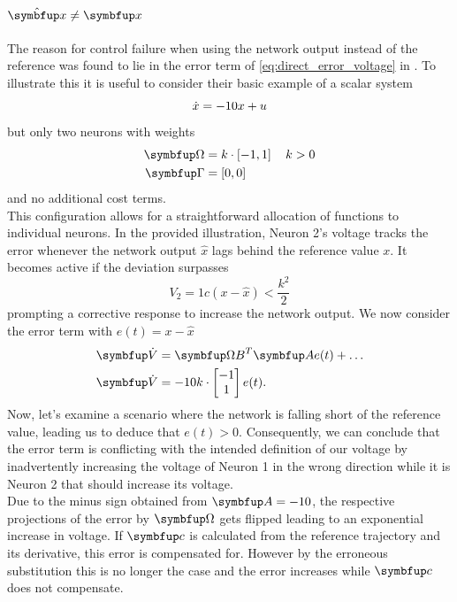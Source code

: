 \paragraph{$\hat{\bmu{x}} \neq \bmu{x}$}
The reason for control failure when using the network output instead of the reference was found to lie in the error term of \cref{eq:direct_error_voltage} in \cite{huang_spiking_2019}. To illustrate this it is useful to consider their basic example of a scalar system
\begin{equation}
\dot{x} = -10x + u\\
\end{equation}
but only two neurons with weights
\begin{equation}
\begin{aligned}
\bmu{\Omega} &= k\cdot\left[-1 , 1\right] \quad k>0\\
\bmu{\Gamma} &= \left[0,0\right]
\end{aligned}
\end{equation}
and no additional cost terms.\\
This configuration allows for a straightforward allocation of functions to individual neurons. In the provided illustration, Neuron 2's voltage tracks the error whenever the network output $\hat{x}$ lags behind the reference value $x$. It becomes active if the deviation surpasses
\begin{equation}
V_2 = 1c\left(x-\hat{x} \right) < \frac{k^2}{2}
\end{equation}
prompting a corrective response to increase the network output.
We now consider the error term with $e(t) = x-\hat{x}$
\begin{equation}
\begin{aligned}
\bmu{\dot{V}}&= \bmu{\Omega B}^T \bmu{A}e(t) + \dots\\
\bmu{\dot{V}}&=  -10k \cdot\begin{bmatrix}-1\\1\end{bmatrix}e(t).
\end{aligned}
\end{equation}
Now, let's examine a scenario where the network is falling short of the reference value, leading us to deduce that $e(t)>0$. Consequently, we can conclude that the error term is conflicting with the intended definition of our voltage by inadvertently increasing the voltage of Neuron 1 in the wrong direction while it is Neuron 2 that should increase its voltage.\\
Due to the minus sign obtained from $\bmu{A} = -10$, the respective projections of the error by $\bmu{\Omega}$ gets flipped leading to an exponential increase in voltage. If $\bmu{c}$ is calculated from the reference trajectory and its derivative, this error is compensated for. However by the erroneous substitution this is no longer the case and the error increases while $\bmu{c}$ does not compensate.\\
